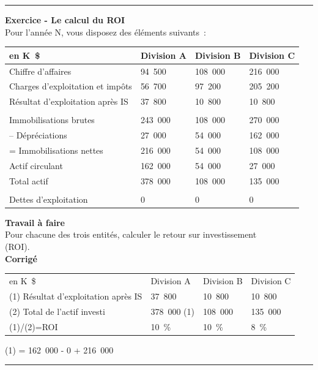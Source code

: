 \documentclass{tufte-handout}
\begin{document}
\begin{enumerate}
\noindent\rule{\textwidth}{0.5pt}
\textbf{Exercice - Le calcul du ROI}\\
Pour l'année N, vous disposez des éléments suivants :\\
\begin{center}
\begin{tabular}{llll}
en K \$ & Division A & Division B & Division C\\
\hline
Chiffre d'affaires & 94 500 & 108 000 & 216 000\\
Charges d'exploitation et impôts & 56 700 & 97 200 & 205 200\\
Résultat d'exploitation après IS & 37 800 & 10 800 & 10 800\\
 &  &  & \\
Immobilisations brutes & 243 000 & 108 000 & 270 000\\
-- Dépréciations & 27 000 & 54 000 & 162 000\\
= Immobilisations nettes & 216 000 & 54 000 & 108 000\\
Actif circulant & 162 000 & 54 000 & 27 000\\
Total actif & 378 000 & 108 000 & 135 000\\
 &  &  & \\
Dettes d'exploitation & 0 & 0 & 0\\
\end{tabular}
\end{center}
\textbf{Travail à faire}\\
Pour chacune des trois entités, calculer le retour sur investissement\\
(ROI).\\
\textbf{Corrigé}\\
\begin{center}
\begin{tabular}{llll}
en K \$ & Division A & Division B & Division C\\
(1) Résultat d'exploitation après IS & 37 800 & 10 800 & 10 800\\
(2) Total de l'actif investi & 378 000 (1) & 108 000 & 135 000\\
(1)/(2)=ROI & 10 \% & 10 \% & 8 \%\\
\end{tabular}
\end{center}
(1) = 162 000 - 0 + 216 000\\

\noindent\rule{\textwidth}{0.5pt}


\end{enumerate}
\end{document}
